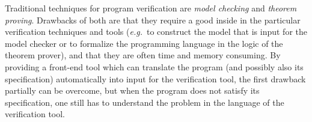 \documentclass[a4paper]{llncs}
\begin{document}

Traditional techniques for program verification are
\textit{model checking} and \textit{theorem proving}. 
Drawbacks of both are that they require a good inside in the
particular verification techniques and tools (\emph{e.g.}~to construct
the model that is input for the model checker or to formalize the
programming language in the logic of the theorem prover), and that
they are often time and memory consuming. By providing a front-end
tool which can translate the program (and possibly also its
specification) automatically into input for the verification tool, the
first drawback partially can be overcome, but when the program does
not satisfy its specification, one still has to understand the problem
in the language of the verification tool.


\end{document}
